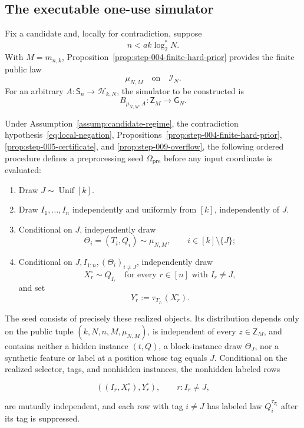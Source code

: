 \subsection{The executable one-use simulator}\label{app:step-010}
Fix a candidate and, locally for contradiction, suppose
\begin{equation}
n<ak\log_2^*N.
\tag{S10.2}\label{eq:local-negation}
\end{equation}
With $M=m_{n,k}$, Proposition~\ref{prop:step-004-finite-hard-prior}
provides the finite public law
\begin{equation}
\mu_{N,M}\quad\text{on}\quad\mathcal I_N.
\tag{S10.3}\label{eq:public-prior}
\end{equation}
For an arbitrary $A:\mathsf S_n\to\mathcal H_{k,N}$, the simulator to be
constructed is
\begin{equation}
B_{\mu_{N,M},A}:\mathsf Z_M\longrightarrow\mathsf G_N.
\tag{S10.5}\label{eq:simulator-type}
\end{equation}
\begin{lemma}\label{lem:step-010-public-preprocessing}
Under Assumption~\ref{assump:candidate-regime}, the contradiction hypothesis~\eqref{eq:local-negation},
Propositions~\ref{prop:step-004-finite-hard-prior},
\ref{prop:step-005-certificate}, and
\ref{prop:step-009-overflow}, the following ordered procedure defines a
preprocessing seed \(\Omega_{\mathrm{pre}}\) before any input coordinate is
evaluated:

\begin{enumerate}
\item Draw \(J\sim\operatorname{Unif}[k]\).
\item Draw \(I_1,\ldots,I_n\) independently and uniformly from \([k]\),
independently of \(J\).
\item Conditional on \(J\), independently draw
   \[
     \Theta_i=(T_i,Q_i)\sim\mu_{N,M},
     \qquad i\in[k]\setminus\{J\};
   \]
\item Conditional on \(J,I_{1:n},(\Theta_i)_{i\ne J}\), independently draw
   \[
     X_r^\circ\sim Q_{I_r}
     \quad\text{for every }r\in[n]\text{ with }I_r\ne J,
   \]
   and set
   \[
     Y_r^\circ:=\tau_{T_{I_r}}(X_r^\circ).
   \]
\end{enumerate}

The seed consists of precisely these realized objects. Its distribution
depends only on the public tuple
\((k,N,n,M,\mu_{N,M})\), is independent of every
\(z\in\mathsf Z_M\), and contains neither a hidden instance
\((t,Q)\), a block-instance draw \(\Theta_J\), nor a synthetic feature or
label at a position whose tag equals \(J\). Conditional on the realized
selector, tags, and nonhidden instances, the nonhidden labeled
rows

\[
  \left((I_r,X_r^\circ),Y_r^\circ\right),
  \qquad r:I_r\ne J,
\tag{S10.6}\label{eq:step-010-6}
\]

are mutually independent, and each row with tag \(i\ne J\) has labeled law
\(Q_i^{\tau_{T_i}}\) after its tag is suppressed.
\end{lemma}

